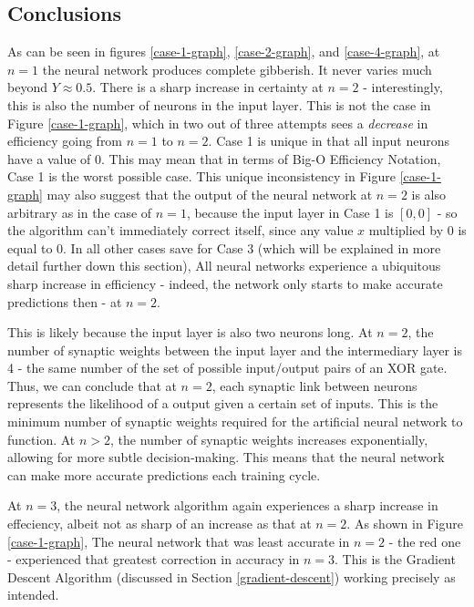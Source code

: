 \documentclass[12pt]{article}
\begin{document}
\subsection{Conclusions \label{conclusions}}

As can be seen in figures \ref{case-1-graph}, \ref{case-2-graph}, and \ref{case-4-graph}, at $n  = 1$ the neural network produces complete gibberish. It never varies much beyond $Y \approx 0.5$. There is a sharp increase in certainty at $n = 2$ - interestingly, this is also the number of neurons in the input layer. This is not the case in Figure \ref{case-1-graph}, which in two out of three attempts sees a \textit{decrease} in efficiency going from $n = 1$ to $n = 2$. Case 1 is unique in that all input neurons have a value of 0. This may mean that in terms of Big-O Efficiency Notation, Case 1 is the worst possible case. This unique inconsistency in Figure \ref{case-1-graph} may also suggest that the output of the neural network at $n = 2$ is also arbitrary as in the case of $n = 1$, because the input layer in Case 1 is $[0, 0]$ - so the algorithm can't immediately correct itself, since any value $x$ multiplied by $0$ is equal to 0. In all other cases save for Case 3 (which will be explained in more detail further down this section), All neural networks experience a ubiquitous sharp increase in efficiency - indeed, the network only starts to make accurate predictions then - at $n = 2$.

This is likely because the input layer is also two neurons long. At $n = 2$, the number of synaptic weights between the input layer and the intermediary layer is 4 - the same number of the set of possible input/output pairs of an XOR gate. Thus, we can conclude that at $n = 2$, each synaptic link between neurons represents the likelihood of a output given a certain set of inputs. This is the minimum number of synaptic weights required for the artificial neural network to function. At $n > 2$, the number of synaptic weights increases exponentially, allowing for more subtle decision-making. This means that the neural network can make more accurate predictions each training cycle.

At $n = 3$, the neural network algorithm again experiences a sharp increase in effeciency, albeit not as sharp of an increase as that at $n = 2$. As shown in Figure \ref{case-1-graph}, The neural network that was least accurate in $n = 2$  - the red one - experienced that greatest correction in accuracy in $n = 3$. This is the Gradient Descent Algorithm (discussed in Section \ref{gradient-descent}) working precisely as intended.
\end{document}
